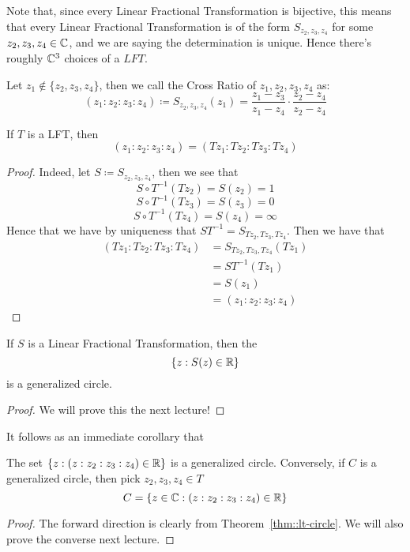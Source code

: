 \begin{remark}
    Note that, since every Linear Fractional Transformation is bijective, this means that every Linear Fractional Transformation is of the form $S_{z_2, z_3, z_4}$ for some $z_2, z_3, z_4 \in \mathbb{C}$, and we are saying the determination is unique. Hence there's roughly $\mathbb{C}^3$ choices of a $LFT$.
\end{remark}

\begin{definition}
    Let $z_1 \notin \{z_2, z_3, z_4\}$, then we call the Cross Ratio of $z_1, z_2, z_3, z_4$ as:
    \[(z_1 : z_2 : z_3 : z_4) \coloneqq S_{z_2, z_3, z_4}(z_1) = \frac{z_1 - z_3}{z_1 - z_4} \cdot \frac{z_2 - z_4}{z_2 - z_4}\]
\end{definition}

\begin{theorem}
    If $T$ is a LFT, then
    \[(z_1: z_2: z_3: z_4) = (Tz_1: Tz_2: Tz_3: Tz_4)\]
\end{theorem}

\begin{proof}
    Indeed, let $S \coloneqq S_{z_2, z_3, z_4}$, then we see that
    \[S \circ T^{-1}(T z_2) = S(z_2) = 1\]
    \[S \circ T^{-1}(T z_3) = S(z_3) = 0\]
    \[S \circ T^{-1}(T z_4) = S(z_4) = \infty\]
    Hence that we have by uniqueness that $ST^{-1} = S_{Tz_2, Tz_3, Tz_4}$. Then we have that
    \begin{align*}
        (Tz_1 : Tz_2 : Tz_3 : Tz_4) &= S_{Tz_2, Tz_3, Tz_4}(Tz_1)\\
        &= ST^{-1}(Tz_1)\\
        &= S(z_1)\\
        &= (z_1: z_2: z_3: z_4)
    \end{align*}
\end{proof}

\begin{theorem}\label{thm::lt-circle}
    If $S$ is a Linear Fractional Transformation, then the
    \[\{z: S(z) \in \mathbb{R}\}\]
    is a generalized circle.
\end{theorem}

\begin{proof}
    We will prove this the next lecture!
\end{proof}

It follows as an immediate corollary that
\begin{corollary}
    The set $\{z: (z: z_2 : z_3: z_4) \in \mathbb{R}\}$ is a generalized circle. Conversely, if $C$ is a generalized circle, then pick $z_2, z_3, z_4 \in T$
    \[C = \{z \in \mathbb{C}: (z: z_2: z_3: z_4) \in \mathbb{R}\}\]
\end{corollary}

\begin{proof}
    The forward direction is clearly from Theorem~\ref{thm::lt-circle}. We will also prove the converse next lecture.
\end{proof}